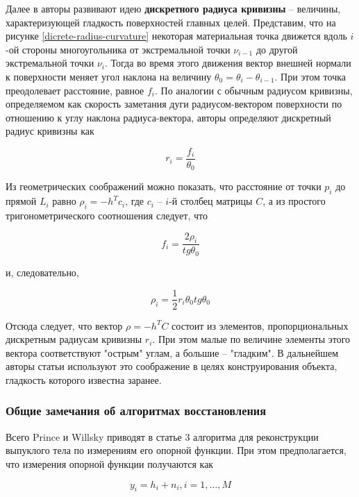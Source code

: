 \documentclass[a4paper, 12pt, titlepage]{article}
\theoremstyle{definition}
\theoremstyle{plain}
\theoremstyle{plain}
\begin{document}
Далее в авторы развивают идею \textbf{дискретного радиуса кривизны} -- величины,
характеризующей гладкость поверхностей главных целей. Представим, что на
рисунке \ref{dicrete-radius-curvature} некоторая материальная точка движется
вдоль $i$-ой стороны многоугольника от экстремальной точки $\nu_{i - 1}$ до
другой экстремальной точки $\nu_{i}$. Тогда во время этого движения вектор
внешней нормали к поверхности меняет угол наклона на величину
$\theta_{0} = \theta_{i} - \theta_{i - 1}$. При этом точка преодолевает
расстояние, равное $f_{i}$. По аналогии с обычным радиусом кривизны,
определяемом как скорость заметания дуги радиусом-вектором поверхности по
отношению к углу наклона радиуса-вектора, авторы определяют дискретный радиус
кривизны как

\begin{equation}
r_{i} = \frac{f_{i}}{\theta_{0}}
\end{equation}

Из геометрических соображений можно показать, что расстояние от точки $p_{i}$
до прямой $L_{i}$ равно $\rho_{i} = -h^{T} c_{i}$, где $c_{i}$ -- $i$-й столбец
матрицы $C$, а из простого тригонометрического соотношения следует, что

\begin{equation}
f_{i} = \frac{2 \rho_{i}}{tg \theta_{0}}
\end{equation}

и, следовательно,

\begin{equation}
\rho_{i} = \frac{1}{2} r_{i} \theta_{0} tg \theta_{0}
\end{equation}

Отсюда следует, что вектор $\rho = - h^{T} C$ состоит из элементов,
пропорциональных дискретным радиусам кривизны $r_{i}$. При этом малые по
величине элементы этого вектора соответствуют "острым" углам, а большие --
"гладким". В дальнейшем авторы статьи используют это соображение в целях
конструирования объекта, гладкость которого известна заранее.

\subsubsection{Общие замечания об алгоритмах восстановления}

Всего Prince и Willsky приводят в статье 3 алгоритма для реконструкции выпуклого
тела по измерениям его опорной функции. При этом предполагается, что измерения
опорной функции получаются как

\begin{equation}
y_{i} = h_{i} + n_{i}, i = 1, \ldots, M
\end{equation}
\end{document}
